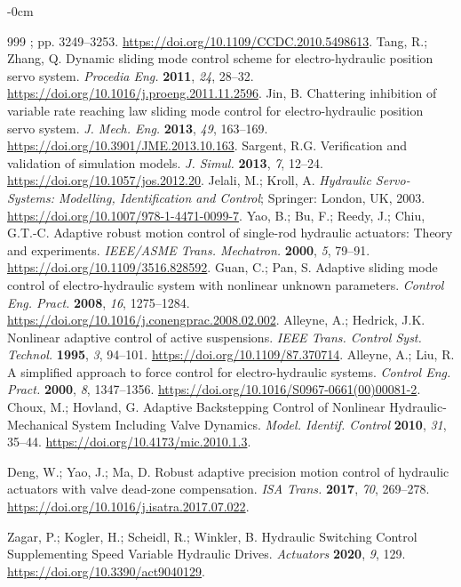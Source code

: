 \documentclass[machines,article,submit,pdftex,moreauthors]{Definitions/mdpi}
\begin{document}
\begin{adjustwidth}{-\extralength}{0cm}
\begin{thebibliography}{999}
; pp. 3249--3253. \url{https://doi.org/10.1109/CCDC.2010.5498613}.
 Tang, R.; Zhang, Q. Dynamic sliding mode control scheme for electro-hydraulic position servo system. \emph{Procedia Eng.} \textbf{2011}, \emph{24}, 28--32. \url{https://doi.org/10.1016/j.proeng.2011.11.2596}.
 Jin, B. Chattering inhibition of variable rate reaching law sliding mode control for electro-hydraulic position servo system. \emph{J. Mech. Eng.} \textbf{2013}, \emph{49}, 163--169. \url{https://doi.org/10.3901/JME.2013.10.163}.
 Sargent, R.G. Verification and validation of simulation models. \emph{J. Simul.} \textbf{2013}, \emph{7}, 12--24. \url{https://doi.org/10.1057/jos.2012.20}.
 Jelali, M.; Kroll, A. \emph{Hydraulic Servo-Systems: Modelling, Identification and Control}; Springer: London, UK, 2003. \url{https://doi.org/10.1007/978-1-4471-0099-7}.
 Yao, B.; Bu, F.; Reedy, J.; Chiu, G.T.-C. Adaptive robust motion control of single-rod hydraulic actuators: Theory and experiments. \emph{IEEE/ASME Trans. Mechatron.} \textbf{2000}, \emph{5}, 79--91. \url{https://doi.org/10.1109/3516.828592}.
 Guan, C.; Pan, S. Adaptive sliding mode control of electro-hydraulic system with nonlinear unknown parameters. \emph{Control Eng. Pract.} \textbf{2008}, \emph{16}, 1275--1284. \url{https://doi.org/10.1016/j.conengprac.2008.02.002}.
 Alleyne, A.; Hedrick, J.K. Nonlinear adaptive control of active suspensions. \emph{IEEE Trans. Control Syst. Technol.} \textbf{1995}, \emph{3}, 94--101. \url{https://doi.org/10.1109/87.370714}.
 Alleyne, A.; Liu, R. A simplified approach to force control for electro-hydraulic systems. \emph{Control Eng. Pract.} \textbf{2000}, \emph{8}, 1347--1356. \url{https://doi.org/10.1016/S0967-0661(00)00081-2}.
 Choux, M.; Hovland, G. Adaptive Backstepping Control of Nonlinear Hydraulic-Mechanical System Including Valve Dynamics. \emph{Model. Identif. Control} \textbf{2010}, \emph{31}, 35--44. \url{https://doi.org/10.4173/mic.2010.1.3}.


 Deng, W.; Yao, J.; Ma, D. Robust adaptive precision motion control of hydraulic actuators with valve dead-zone compensation. \emph{ISA Trans.} \textbf{2017}, \emph{70}, 269--278. \url{https://doi.org/10.1016/j.isatra.2017.07.022}.



 Zagar, P.; Kogler, H.; Scheidl, R.; Winkler, B. Hydraulic Switching Control Supplementing Speed Variable Hydraulic Drives. \emph{Actuators} \textbf{2020}, \emph{9}, 129. \url{https://doi.org/10.3390/act9040129}.



\end{thebibliography}
\end{adjustwidth}
\end{document}
